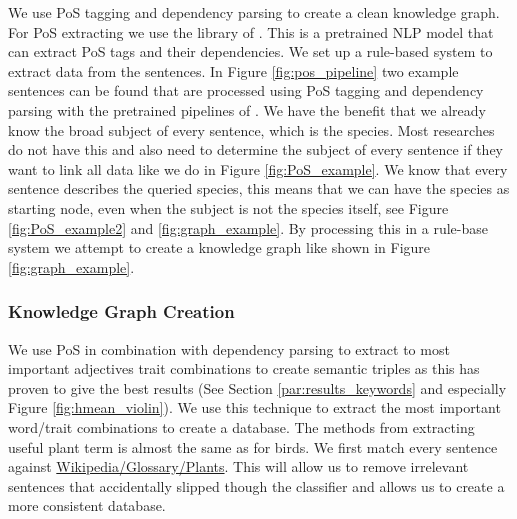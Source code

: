 \documentclass[a4paper, 12pt, oneside]{book} %
\begin{document}
We use PoS tagging and dependency parsing to create a clean knowledge graph.
For PoS extracting we use the library of \textcite{honnibal_spacy_2020}.
This is a pretrained NLP model that can extract PoS tags and their dependencies.
We set up a rule-based system to extract data from the sentences.
In Figure \ref{fig:pos_pipeline} two example sentences can be found that are processed using PoS tagging and dependency parsing with the pretrained pipelines of \textcite{honnibal_spacy_2020}.
We have the benefit that we already know the broad subject of every sentence, which is the species.
Most researches do not have this and also need to determine the subject of every sentence if they want to link all data \autocite{hutchison_knowledge_2013} like we do in Figure \ref{fig:PoS_example}.
We know that every sentence describes the queried species, this means that we can have the species as starting node, even when the subject is not the species itself, see Figure \ref{fig:PoS_example2} and \ref{fig:graph_example}.
By processing this in a rule-base system we attempt to create a knowledge graph like shown in Figure \ref{fig:graph_example}.



\subsubsection{Knowledge Graph Creation}
We use PoS in combination with dependency parsing to extract to most important adjectives trait combinations to create semantic triples as this has proven to give the best results (See Section \ref{par:results_keywords} and especially Figure \ref{fig:hmean_violin}).
We use this technique to extract the most important word/trait combinations to create a database.
The methods from extracting useful plant term is almost the same as for birds.
We first match every sentence against \href{https://en.wikipedia.org/wiki/Glossary_of_plant_morphology}{Wikipedia/Glossary/Plants}.
This will allow us to remove irrelevant sentences that accidentally slipped though the classifier and allows us to create a more consistent database.
\end{document}
